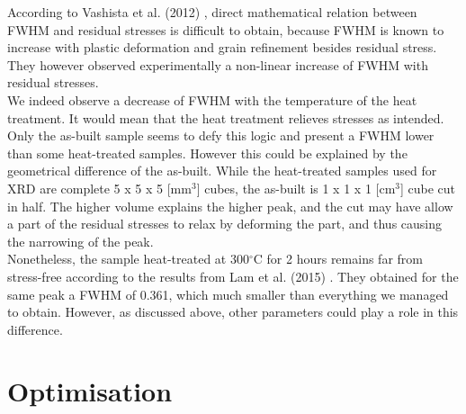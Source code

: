 
According to Vashista et al. (2012) \cite{Vashista12}, direct mathematical relation between FWHM and residual stresses is difficult to obtain, because FWHM is known to increase with plastic deformation and grain refinement besides residual stress. They however observed experimentally a non-linear increase of FWHM with residual stresses.\\

We indeed observe a decrease of FWHM with the temperature of the heat treatment. It would mean that the heat treatment relieves stresses as intended. Only the as-built sample seems to defy this logic and present a FWHM lower than some heat-treated samples. However this could be explained by the geometrical difference of the as-built. While the heat-treated samples used for XRD are complete 5 x 5 x 5 [mm$^3$] cubes, the as-built is 1 x 1 x 1 [cm$^3$] cube cut in half. The higher volume explains the higher peak, and the cut may have allow a part of the residual stresses to relax by deforming the part, and thus causing the narrowing of the peak.\\

Nonetheless, the sample heat-treated at 300$^\circ$C for 2 hours remains far from stress-free according to the results from Lam et al. (2015) \cite{Lam15}. They obtained for the same peak a FWHM of 0.361, which much smaller than everything we managed to obtain. However, as discussed above, other parameters could play a role in this difference.

\section{Optimisation}



